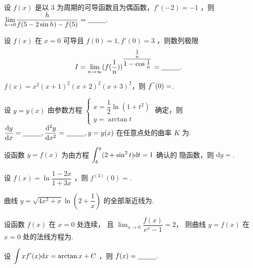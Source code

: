 \begin{quest}[660T29]
    设 $ f(x) $ 是以 $ 3 $ 为周期的可导函数且为偶函数，$ f'(-2) = -1 $ ，则
    $ {\displaystyle\lim_{h\rightarrow 0}}\dfrac{h}{f(5-2\sin h) - f(5)} = \underline{~~~~~~~~}. $ 
\end{quest}

\begin{quest}[660T30]
    设 $ f(x) $ 在 $ x= 0 $ 可导且 $ f(0) = 1,f'(0)=3 $ ，则数列极限
    $$
    \displaystyle I = {\displaystyle\lim_{n\rightarrow \infty}}
    (f(\dfrac{1}{n}))^{\dfrac{\frac{1}{n}}{1-\cos\frac{1}{n}}} =\underline{~~~~~~~~}.
    $$
\end{quest}

\begin{quest}[660T33]
    $ f(x) = x^2(x+1)^2(x+2)^2(x+3)^2 $，则 $ f^"(0) =$\qline. 
\end{quest}

\begin{quest}[660T34]
    设 $ y = y(x) $ 由参数方程 
    $ \begin{cases}
        x = \dfrac{1}{2}\ln (1+t^2)\\ y = \arctan t
    \end{cases} $ 确定，则 $ \dfrac{\mathrm{d}y}{\mathrm{d}x} = \underline{~~~~~~~~},
    \dfrac{\mathrm{d}^2y}{\mathrm{d}x^2}=\underline{~~~~~~~~},y = y(x) $ 在任意点处的曲率 $ K $ 为\qline.
\end{quest}

\begin{quest}[660T38]
    设函数 $ y=f(x) $ 为由方程 $ \displaystyle \int_b^y(2+\sin^2t)\mathrm{d}t = 1 $ 确认的
    隐函数，则 $ \mathrm{d}y =$\qline.
\end{quest}

\begin{quest}[660T40]
    设 $ f(x) =\ln \dfrac{1-2x}{1+3x} $ ，则 $ f^{(3)}(0) = $\qline. 
\end{quest}

\begin{quest}[660T48]
    曲线 $ y = \sqrt{4x^2+x}\ln (2+\dfrac{1}{x}) $ 的全部渐近线为\qline.
\end{quest}

\begin{quest}[660T49]
    设函数 $ f(x) $ 在 $ x = 0 $ 处连续，
    且 $ {\displaystyle\lim_{x\rightarrow 0}}\dfrac{f(x)}{e^x - 1} = 2 $，
    则曲线 $ y = f(x) $ 在 $ x = 0 $ 处的法线方程为\qline.
\end{quest}

\begin{quest}[660T51]
    设 $ \displaystyle \int xf'(x)\mathrm{d}x = \arctan x + C $ ，则 $ f(x) = \underline{~~~~~~~~}. $ 
\end{quest}

